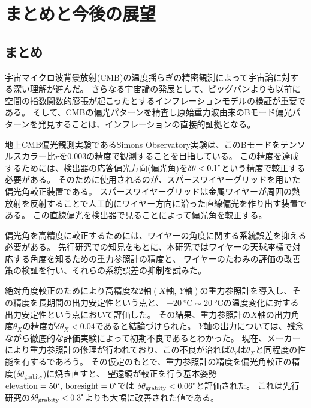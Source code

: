 \documentclass[../../main.tex]{subfiles}
\begin{document}
\chapter{まとめと今後の展望}
\section{まとめ}
宇宙マイクロ波背景放射(CMB)の温度揺らぎの精密観測によって宇宙論に対する深い理解が進んだ。
さらなる宇宙論の発展として、ビッグバンよりも以前に空間の指数関数的膨張が起こったとするインフレーションモデルの検証が重要である。
そして、CMBの偏光パターンを精査し原始重力波由来のBモード偏光パターンを発見することは、インフレーションの直接的証拠となる。

地上CMB偏光観測実験であるSimons Observatory実験は、このBモードをテンソルスカラー比$r$を$0.003$の精度で観測することを目指している。
この精度を達成するためには、検出器の応答偏光方向(偏光角)を$\delta\theta<0.1\tcdegree$という精度で較正する必要がある。
そのために使用されるのが、スパースワイヤーグリッドを用いた偏光角較正装置である。
スパースワイヤーグリッドは金属ワイヤーが周囲の熱放射を反射することで人工的にワイヤー方向に沿った直線偏光を作り出す装置である。
この直線偏光を検出器で見ることによって偏光角を較正する。

偏光角を高精度に較正するためには、ワイヤーの角度に関する系統誤差を抑える必要がある。
先行研究での知見をもとに、本研究ではワイヤーの天球座標で対応する角度を知るための重力参照計の精度と、
ワイヤーのたわみの評価の改善策の検証を行い、それらの系統誤差の抑制を試みた。

絶対角度較正のためにより高精度な2軸$(X\text{軸},\,Y\text{軸})$の重力参照計を導入し、その精度を長期間の出力安定性という点と、
$\SI{-20}{\degreeCelsius}\sim\SI{20}{\degreeCelsius}$の温度変化に対する出力安定性という点において評価した。
その結果、重力参照計の$X$軸の出力角度$\theta_{X}$の精度が$\delta\theta_{X}<0.04$であると結論づけられた。
$Y$軸の出力については、残念ながら徹底的な評価実験によって初期不良であるとわかった。
現在、メーカーにより重力参照計の修理が行われており、この不良が治れば$\theta_{Y}$は$\theta_{X}$と同程度の性能を有するであろう。
その仮定のもとで、重力参照計の精度を偏光角較正の精度($\delta\theta_{\mathrm{grabity}}$)に焼き直すと、
望遠鏡が較正を行う基本姿勢$\mathrm{elevation}=50\tcdegree,\,\mathrm{boresight}=0\tcdegree$では
$\delta\theta_{\mathrm{grabity}}<0.06\tcdegree$と評価された。
これは先行研究の$\delta\theta_{\mathrm{grabity}}<0.3\tcdegree$よりも大幅に改善された値である。
\end{document}
